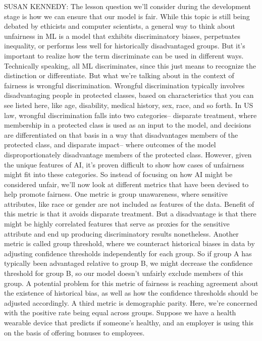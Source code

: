 SUSAN KENNEDY: The lesson question we'll consider during the development stage
is how we can ensure that our model is fair.
While this topic is still being debated by ethicists and computer scientists,
a general way to think about unfairness in ML
is a model that exhibits discriminatory biases,
perpetuates inequality, or performs less well
for historically disadvantaged groups.
But it's important to realize how the term discriminate can
be used in different ways.
Technically speaking, all ML discriminates, since this
just means to recognize the distinction or differentiate.
But what we're talking about in the context of fairness
is wrongful discrimination.
Wrongful discrimination typically involves disadvantaging people
in protected classes, based on characteristics
that you can see listed here, like age, disability, medical history, sex, race,
and so forth.
In US law, wrongful discrimination falls into two categories--
disparate treatment, where membership in a protected class is used as an input
to the model, and decisions are differentiated
on that basis in a way that disadvantages members of the protected
class, and disparate impact--
where outcomes of the model disproportionately disadvantage members
of the protected class.
However, given the unique features of AI,
it's proven difficult to show how cases of unfairness
might fit into these categories.
So instead of focusing on how AI might be considered unfair,
we'll now look at different metrics that have
been devised to help promote fairness.
One metric is group unawareness, where sensitive attributes,
like race or gender are not included as features of the data.
Benefit of this metric is that it avoids disparate treatment.
But a disadvantage is that there might be highly correlated features that
serve as proxies for the sensitive attribute
and end up producing discriminatory results nonetheless.
Another metric is called group threshold,
where we counteract historical biases in data
by adjusting confidence thresholds independently for each group.
So if group A has typically been advantaged relative to group B,
we might decrease the confidence threshold for group B,
so our model doesn't unfairly exclude members of this group.
A potential problem for this metric of fairness
is reaching agreement about the existence of historical bias,
as well as how the confidence thresholds should be adjusted accordingly.
A third metric is demographic parity.
Here, we're concerned with the positive rate being equal across groups.
Suppose we have a health wearable device that predicts if someone's healthy,
and an employer is using this on the basis of offering bonuses to employees.
